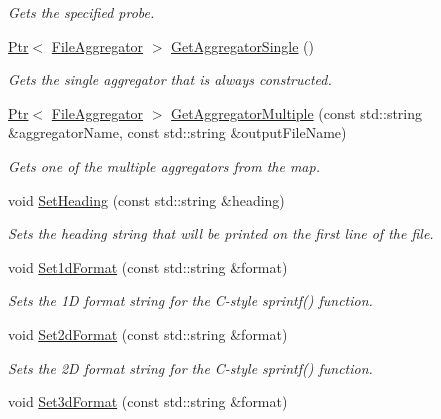 \begin{DoxyCompactItemize}
\begin{DoxyCompactList}\small\item\em Gets the specified probe. \end{DoxyCompactList}\item 
\hyperlink{classns3_1_1Ptr}{Ptr}$<$ \hyperlink{classns3_1_1FileAggregator}{File\+Aggregator} $>$ \hyperlink{classns3_1_1FileHelper_a13c1e917be6ab94fff56c5262cc080d1}{Get\+Aggregator\+Single} ()
\begin{DoxyCompactList}\small\item\em Gets the single aggregator that is always constructed. \end{DoxyCompactList}\item 
\hyperlink{classns3_1_1Ptr}{Ptr}$<$ \hyperlink{classns3_1_1FileAggregator}{File\+Aggregator} $>$ \hyperlink{classns3_1_1FileHelper_ade18c5e4b819b64d76f386b22d541d24}{Get\+Aggregator\+Multiple} (const std\+::string \&aggregator\+Name, const std\+::string \&output\+File\+Name)
\begin{DoxyCompactList}\small\item\em Gets one of the multiple aggregators from the map. \end{DoxyCompactList}\item 
void \hyperlink{classns3_1_1FileHelper_a09175849a91e38a10157a888b4373b8b}{Set\+Heading} (const std\+::string \&heading)
\begin{DoxyCompactList}\small\item\em Sets the heading string that will be printed on the first line of the file. \end{DoxyCompactList}\item 
void \hyperlink{classns3_1_1FileHelper_a8c0d73e5fbc0ffdf6af076a57e870fe8}{Set1d\+Format} (const std\+::string \&format)
\begin{DoxyCompactList}\small\item\em Sets the 1D format string for the C-\/style sprintf() function. \end{DoxyCompactList}\item 
void \hyperlink{classns3_1_1FileHelper_a02e20b5168d716e37e5add59653a985a}{Set2d\+Format} (const std\+::string \&format)
\begin{DoxyCompactList}\small\item\em Sets the 2D format string for the C-\/style sprintf() function. \end{DoxyCompactList}\item 
void \hyperlink{classns3_1_1FileHelper_a1e84e5703eb2848ad298235574416949}{Set3d\+Format} (const std\+::string \&format)

\end{DoxyCompactItemize}
